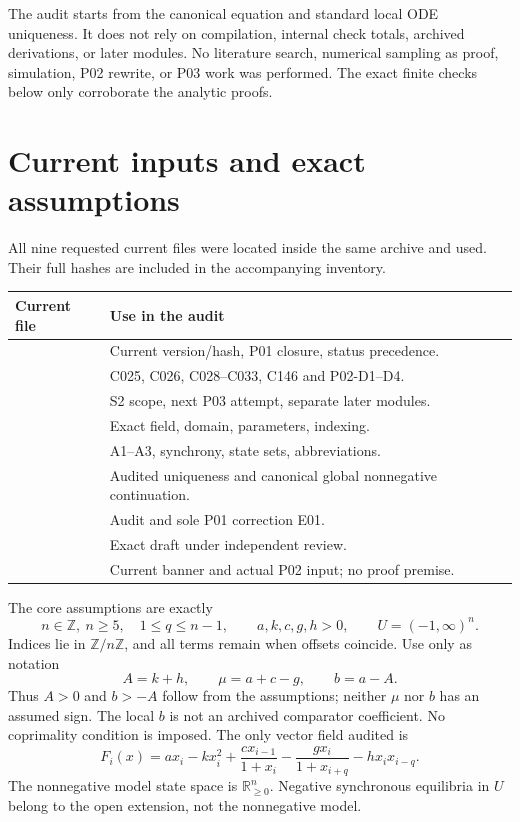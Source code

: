 \documentclass[11pt]{article}
\newcommand{\RR}{\mathbb R}
\newcommand{\ZZ}{\mathbb Z}
\newcommand{\Dom}{(-1,\infty)^n}
\newcommand{\Orth}{\RR_{\geq0}^{n}}
\begin{document}
The audit starts from the canonical equation and standard local ODE
uniqueness. It does not rely on compilation, internal check totals,
archived derivations, or later modules. No literature search, numerical
sampling as proof, simulation, P02 rewrite, or P03 work was performed.
The exact finite checks below only corroborate the analytic proofs.

\section{Current inputs and exact assumptions}

All nine requested current files were located inside the same archive
and used. Their full hashes are included in the accompanying inventory.
\begin{longtable}{@{}P{0.50\textwidth}P{0.44\textwidth}@{}}
\toprule
Current file & Use in the audit\\
\midrule
\endhead
{} & Current version/hash, P01 closure, status precedence.\\
 & C025, C026, C028--C033, C146 and P02-D1--D4.\\
 & S2 scope, next P03 attempt, separate later modules.\\
 & Exact field, domain, parameters, indexing.\\
 & A1--A3, synchrony, state sets, abbreviations.\\
 & Audited uniqueness and canonical global nonnegative continuation.\\
 & Audit and sole P01 correction E01.\\
 & Exact draft under independent review.\\
 & Current banner and actual P02 input; no proof premise.\\
\bottomrule
\end{longtable}

The core assumptions are exactly
\begin{equation}\label{A02:assumptions}
n\in\ZZ,\ n\ge5,\quad 1\le q\le n-1,\qquad
a,k,c,g,h>0,\qquad U=\Dom.
\end{equation}
Indices lie in \(\ZZ/n\ZZ\), and all terms remain when offsets coincide.
Use only as notation
\[
A=k+h,\qquad \mu=a+c-g,\qquad b=a-A.
\]
Thus \(A>0\) and \(b>-A\) follow from the assumptions; neither \(\mu\)
nor \(b\) has an assumed sign. The local \(b\) is not an archived
comparator coefficient. No coprimality condition is imposed.
The only vector field audited is
\begin{equation}\label{A02:field}
F_i(x)=ax_i-kx_i^2+\frac{cx_{i-1}}{1+x_i}
-\frac{gx_i}{1+x_{i+q}}-hx_ix_{i-q}.
\end{equation}
The nonnegative model state space is \(\Orth\).
Negative synchronous equilibria in \(U\) belong to the open extension,
not the nonnegative model.
\end{document}
